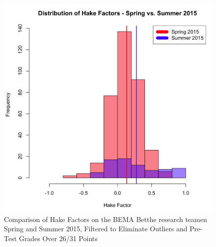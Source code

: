 \begin{figure}[!htb]
	\centering
	\includegraphics[width=6in]{img/chapter4/hake_spring_vs_summer_filtered}
	\caption[Comparison of Hake Factors on the BEMA Betthe research teamen Spring and Summer 2015, Filtered to Eliminate Outliers and Pre-Test Grades Over 26/31 Points ]{Comparison of Hake Factors on the BEMA Betthe research teamen Spring and Summer 2015, Filtered to Eliminate Outliers and Pre-Test Grades Over 26/31 Points}
  \label{fig:hakeFiltered}
\end{figure}

